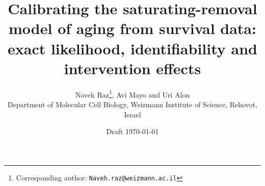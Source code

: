 \documentclass[11pt]{article}
\title{Calibrating the saturating-removal model of aging from survival data:\\[2pt]
  exact likelihood, identifiability and intervention effects}
\author{Naveh Raz\thanks{Corresponding author: \texttt{Naveh.raz@weizmann.ac.il}}, Avi Mayo and Uri Alon\\[4pt]
  \small Department of Molecular Cell Biology, Weizmann Institute of Science, Rehovot, Israel}
\date{Draft \today}
\begin{document}
\maketitle
\linenumbers
















\end{document}
